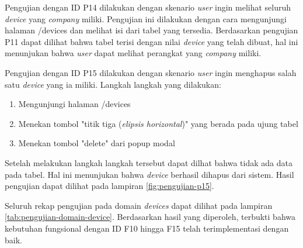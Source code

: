 Pengujian dengan ID P14 dilakukan dengan skenario \textit{user} ingin melihat seluruh \textit{device} yang \textit{company} miliki. Pengujian ini dilakukan dengan cara mengunjungi halaman /devices dan melihat isi dari tabel yang tersedia. Berdasarkan pengujian P11 dapat dilihat bahwa tabel terisi dengan nilai \textit{device} yang telah dibuat, hal ini menunjukan bahwa \textit{user} dapat melihat perangkat yang \textit{company} miliki.

Pengujian dengan ID P15 dilakukan dengan skenario \textit{user} ingin menghapus salah satu \textit{device} yang ia miliki. Langkah langkah yang dilakukan:
\begin{enumerate}
  \item Mengunjungi halaman /devices
  \item Menekan tombol "titik tiga (\textit{elipsis horizontal})" yang berada pada ujung tabel
  \item Menekan tombol "delete" dari popup modal
\end{enumerate}

Setelah melakukan langkah langkah tersebut dapat dilhat bahwa tidak ada data pada tabel. Hal ini menunjukan bahwa \textit{device} berhasil dihapus dari sistem. Hasil pengujian dapat dilihat pada lampiran \ref{fig:pengujian-p15}.

Seluruh rekap pengujian pada domain \textit{devices} dapat dilihat pada lampiran \ref{tab:pengujian-domain-device}. Berdasarkan hasil yang diperoleh, terbukti bahwa kebutuhan fungsional dengan ID F10 hingga F15 telah terimplementasi dengan baik.
